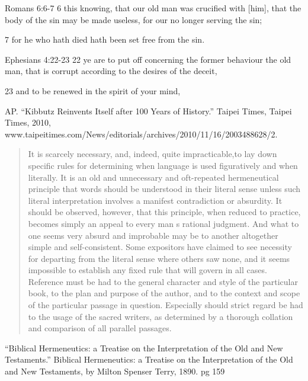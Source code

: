 \documentclass[11pt]{article}
\begin{document}
\begin{thebibliography}{37}
Romans 6:6-7
6 this knowing, that our old man was crucified with [him], that the body of the sin may be made useless, for our no longer serving the sin;

7 for he who hath died hath been set free from the sin.

Ephesians 4:22-23
22 ye are to put off concerning the former behaviour the old man, that is corrupt according to the desires of the deceit,

23 and to be renewed in the spirit of your mind,

AP. “Kibbutz Reinvents Itself after 100 Years of History.” Taipei Times, Taipei Times, 2010, www.taipeitimes.com/News/editorials/archives/2010/11/16/2003488628/2.


\begin{quote}
It is scarcely necessary, and, indeed, quite impracticable,to lay down specific rules for determining when language is used figuratively and when literally. It is an old and unnecessary and oft-repeated hermeneutical principle that words should be understood in their literal sense unless such literal interpretation involves a manifest contradiction or absurdity.
It should be observed, however, that this principle, when reduced to practice,
becomes simply an appeal to every man s rational judgment. And
what to one seems very absurd and improbable may be to another
altogether simple and self-consistent. Some expositors have claimed
to see necessity for departing from the literal sense where others
saw none, and it seems impossible to establish any fixed rule that
will govern in all cases. Reference must be had to the general character and style of the particular book, to the plan and purpose of the author, and to the context and scope of the particular passage in question. Especially should strict regard be had to the usage of the sacred writers, as determined by a thorough collation and comparison of all parallel passages.
\end{quote}
“Biblical Hermeneutics: a Treatise on the Interpretation of the Old and New Testaments.” Biblical Hermeneutics: a Treatise on the Interpretation of the Old and New Testaments, by Milton Spenser Terry, 1890. pg 159




\end{thebibliography}
\end{document}
